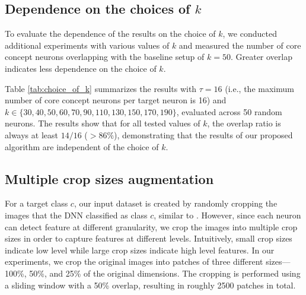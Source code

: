 \subsection{{Dependence on the choices of $k$}}
\label{sec:choice_of_k}
{To evaluate the dependence of the results on the choice of $k$, we conducted additional experiments with various values of $k$ and measured the number of core concept neurons overlapping with the baseline setup of $k=50$. Greater overlap indicates less dependence on the choice of $k$.}

{Table \ref{tab:choice_of_k} summarizes the results with $\tau = 16$ (i.e., the maximum number of core concept neurons per target neuron is 16) and $k \in \{30, 40, 50, 60, 70, 90, 110, 130, 150, 170, 190\}$, evaluated across 50 random neurons. The results show that for all tested values of $k$, the overlap ratio is always at least $14/16$ ($>86\%$), demonstrating that the results of our proposed algorithm are independent of the choice of $k$.}

\begin{table}[t]
\caption{{The overlap of sets of core concept neurons of different $k$ compared to the baseline $k=50$}}
\label{tab:choice_of_k}
\begin{center}\renewcommand{\arraystretch}{1.2}
\end{center}
\end{table}

\subsection{Multiple crop sizes augmentation}
\label{sec:multi_crop_sizes}
For a target class $c$, our input dataset is created by randomly cropping the images that the DNN classified as class $c$, similar to \citet{CRAFT}. However, since each neuron can detect feature at different granularity, we crop the images into multiple crop sizes in order to capture features at different levels. Intuitively, small crop sizes indicate low level while large crop sizes indicate high level features. 
{In our experiments, we crop the original images into patches of three different sizes— 100\%, 50\%, and 25\% of the original dimensions. The cropping is performed using a sliding window with a 50\% overlap, resulting in roughly 2500 patches in total.}

